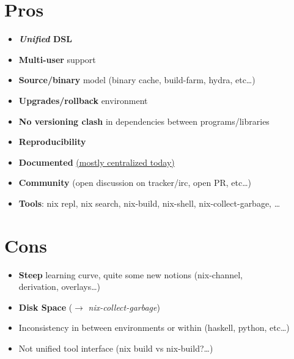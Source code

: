 \documentclass[smaller]{beamer}
\begin{document}
\section{Pros}
\label{sec:orgd8b99de}
\begin{itemize}
\item \textbf{\textbf{\emph{Unified} DSL}}\\
\item \textbf{\textbf{Multi-user}} support\\
\item \textbf{\textbf{Source/binary}} model (binary cache, build-farm, hydra, etc\ldots{})\\
\item \textbf{\textbf{Upgrades/rollback}} environment\\
\item \textbf{\textbf{No versioning clash}} in dependencies between programs/libraries\\
\item \textbf{\textbf{Reproducibility}}\\
\item \textbf{\textbf{Documented}} \href{https://nixos.org/}{(mostly centralized today)}\\
\item \textbf{\textbf{Community}} (open discussion on tracker/irc, open PR, etc\ldots{})\\
\item \textbf{\textbf{Tools}}: nix repl, nix search, nix-build, nix-shell, nix-collect-garbage, \ldots{}\\
\end{itemize}

\section{Cons}
\label{sec:org61bfa37}

\begin{itemize}
\item \textbf{\textbf{Steep}} learning curve, quite some new notions (nix-channel,\\
derivation, overlays\ldots{})\\
\item \textbf{\textbf{Disk Space}} (\(\rightarrow\) \emph{nix-collect-garbage})\\
\item Inconsistency in between environments or within (haskell, python, etc\ldots{})\\
\item Not unified tool interface (nix build vs nix-build?\ldots{})\\
\end{itemize}
\end{document}
